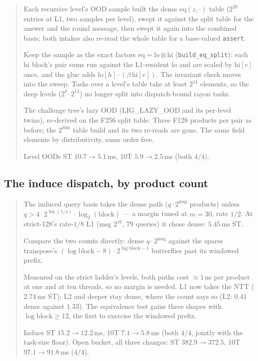 \documentclass[11pt]{article}
\newcommand{\eq}{\mathrm{eq}}
\newcommand{\code}[1]{\texttt{#1}}
\newenvironment{optsummary}{%
  \begin{quote}\small
  \begin{description}
  \setlength{\itemsep}{1pt}\setlength{\parsep}{0pt}\setlength{\topsep}{2pt}
}{%
  \end{description}
  \end{quote}
}
\begin{document}
\begin{optsummary}
\item[Baseline:] Each recursive level's OOD sample built the dense $\eq(z,\cdot)$ table ($2^{20}$ entries at L1, two samples per level), swept it against the split table for the answer and the round message, then swept it again into the combined basis; both intakes also re-read the whole table for a base-valued \code{assert}.
\item[Improvement:] Keep the sample as the exact factors $\eq = \mathrm{lo}\otimes\mathrm{hi}$ (\code{build\_eq\_split}): each $\mathrm{hi}$ block's pair sums run against the L1-resident $\mathrm{lo}$ and are scaled by $\mathrm{hi}[e]$ once, and the glue adds $\mathrm{lo}[h]\cdot(\beta\,\mathrm{hi}[e])$. The invariant check moves into the sweep. Tasks over a level's table take at least $2^{14}$ elements, so the deep levels ($2^8$--$2^{14}$) no longer split into dispatch-bound rayon tasks.
\item[Mechanism:] The challenge tree's lazy OOD (LIG\_LAZY\_OOD and its per-level twins), re-derived on the F256 split table. Three F128 products per pair as before; the $2^{\mathrm{dim}}$ table build and its two re-reads are gone. The same field elements by distributivity, sums order-free.
\item[Result:] Level OODs ST $10.7\to5.1\,$ms, 10T $5.9\to2.5\,$ms (both $4/4$).
\end{optsummary}

\subsection{The induce dispatch, by product count}\label{sec:inducecost}

\begin{optsummary}
\item[Baseline:] The induced query basis takes the dense path ($q\cdot2^{\mathrm{msg}}$ products) unless $q > 4\cdot2^{\log(1/\rho)}\cdot\log_2(\mathrm{block})$ --- a margin tuned at $m{=}30$, rate $1/2$. At strict-128's rate-$1/8$ L1 (msg $2^{16}$, $79$ queries) it chose dense: $5.45\,$ms ST.
\item[Improvement:] Compare the two counts directly: dense $q\cdot2^{\mathrm{msg}}$ against the sparse transpose's $(\log\mathrm{block}-8)\cdot2^{\log\mathrm{block}-1}$ butterflies past its windowed prefix.
\item[Mechanism:] Measured on the strict ladder's levels, both paths cost $\approx1\,$ns per product at one and at ten threads, so no margin is needed. L1 now takes the NTT ($2.74\,$ms ST); L2 and deeper stay dense, where the count says so (L2: $0.41$ dense against $1.33$). The equivalence test gains three shapes with $\log\mathrm{block}\ge12$, the first to exercise the windowed prefix.
\item[Result:] Induce ST $15.2\to12.2\,$ms, 10T $7.1\to5.8\,$ms (both $4/4$, jointly with the task-size floor). Open bucket, all three changes: ST $382.9\to372.5$, 10T $97.1\to91.8\,$ms ($4/4$).
\end{optsummary}
\end{document}

